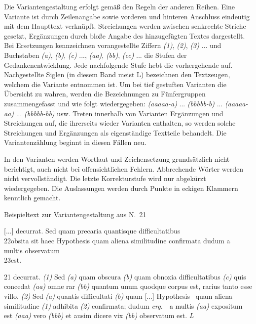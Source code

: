 Die Variantengestaltung erfolgt gem\"{a}ß den Regeln der anderen Reihen. Eine Variante ist durch Zeilenangabe sowie vorderen und hinteren Anschluss eindeutig mit dem Haupttext verkn\"{u}pft. Streichungen werden zwischen senkrechte Striche gesetzt, Erg\"{a}nzungen durch bloße Angabe des hinzugef\"{u}gten Textes dargestellt. Bei Ersetzungen kennzeichnen vorangestellte Ziffern \textit{(1)}, \textit{(2)}, \textit{(3)} ... und Buchstaben \textit{(a)}, \textit{(b)}, \textit{(c)} ..., \textit{(aa)}, \textit{(bb)}, \textit{(cc)} ... die Stufen der Gedankenentwicklung. Jede nachfolgende Stufe hebt die vorhergehende auf. Nachgestellte Siglen (in diesem Band meist L) bezeichnen den Textzeugen, welchem die Variante entnommen ist. Um bei tief gestuften Varianten die \"{U}bersicht zu wahren, werden die Bezeichnungen zu F\"{u}nfergruppen zusammengefasst und wie folgt wiedergegeben: \textit{(aaaaa-a)} ... \textit{(bbbbb-b)} ... \textit{(aaaaa-aa)} ... \textit{(bbbbb-bb)} usw. Treten innerhalb von Varianten Erg\"{a}nzungen und Streichungen auf, die ihrerseits wieder Varianten enthalten, so werden solche Streichungen und Erg\"{a}nzungen als eigenst\"{a}ndige Textteile behandelt. Die Variantenz\"{a}hlung beginnt in diesen F\"{a}llen neu.\par
In den Varianten werden Wortlaut und Zeichensetzung grunds\"{a}tzlich nicht berichtigt, auch nicht bei offensichtlichen Fehlern. Abbrechende W\"{o}rter werden nicht vervollst\"{a}ndigt. Die letzte Korrekturstufe wird nur abgek\"{u}rzt wiedergegeben. Die Auslassungen werden durch Punkte in eckigen Klammern kenntlich gemacht.\par\vspace{1.0ex}
\clearpage
\noindent Beispieltext zur Variantengestaltung aus N.~21\par\vspace{1.0ex}
\hspace{1cm}[...] decurrat. Sed quam precaria quantisque difficultatibus\\
22\hspace{1cm}obsita sit haec Hypothesis quam aliena similitudine confirmata dudum a\\ multis observatum\\
23\hspace{1cm}est.\par\vspace{0.5cm}
\noindent \footnotesize 21 decurrat. \textit{(1)} Sed \textit{(a)} quam obscura \textit{(b)} quam obnoxia difficultatibus \textit{(c)} quis concedat \textit{(aa)} omne rar \textit{(bb)} quantum unum quodque corpus est, rarius tanto esse villo. \textit{(2)} Sed \textit{(a)} quantis difficultati \textit{(b)} quam [...] Hypothesis \textbar\ quam aliena similitudine \textit{(1)} adhibita \textit{(2)} confirmata; dudum \textit{erg.}\ \textbar\ a multis \textit{(aa)} expositum est \textit{(aaa)} vero \textit{(bbb)} et ausim dicere vix \textit{(bb)} observatum est. \textit{L}\par
